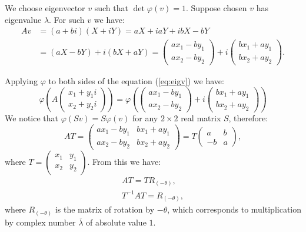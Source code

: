 \documentclass{article}
\theoremstyle{definition}
\begin{document}
We choose eigenvector $v$ such that $\det \varphi (v) = 1$.
Suppose chosen $v$ has eigenvalue $\lambda$.
For such $v$ we have:
\begin{equation}
    \begin{aligned} \label{eq:eigv}
        A v 
        & = (a + bi) (X + iY)
        = aX + iaY + ibX - bY \\
        & = (aX-bY) + i (bX+aY)
        =
        \begin{pmatrix}
            a x_1 - b y_1 \\
            a x_2 - b y_2
        \end{pmatrix}
        +i
        \begin{pmatrix}
            b x_1 + a y_1 \\
            b x_2 + a y_2
        \end{pmatrix}.
    \end{aligned}
\end{equation}

Applying $\varphi$ to both sides of the equation (\ref{eq:eigv}) we have:
\[
    \varphi
    \left( A
        \begin{pmatrix}
            x_1 + y_1 i \\
            x_2 + y_2 i
        \end{pmatrix}
    \right)
    =
    \varphi
    \left(
        \begin{pmatrix}
            a x_1 - b y_1 \\
            a x_2 - b y_2
        \end{pmatrix}
        +i
        \begin{pmatrix}
            b x_1 + a y_1 \\
            b x_2 + a y_2
        \end{pmatrix}
    \right)
\]
We notice that $\varphi (Sv) = S \varphi(v)$ for any $2 \times 2$ real matrix $S$, therefore:
\[
    A T
    =
    \begin{pmatrix}
        a x_1 - b y_1 &  b x_1 + a y_1 \\
        a x_2 - b y_2 &  b x_2 + a y_2
    \end{pmatrix}
    =
    T
    \begin{pmatrix}
        a & b \\
        -b & a
    \end{pmatrix},
\]
where 
$
    T =
    \begin{pmatrix}
        x_1 & y_1 \\
        x_2 & y_2
    \end{pmatrix}
$.
From this we have:
\begin{align*}
    A T = T R_{(-\theta)}, \\
    T^{-1} A T = R_{(-\theta)},
\end{align*}
where $R_{(-\theta)}$ is the matrix of rotation by $-\theta$, which corresponds to multiplication by complex number $\overline{\lambda}$ of absolute value $1$.
\end{document}
